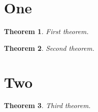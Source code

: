 \documentclass{article}
\newtheorem{theo}{Theorem}
\begin{document}
\section{One}
\begin{theo}
First theorem.
\end{theo}

\begin{theo}
Second theorem.
\end{theo}

\section{Two}
\begin{theo}
Third theorem.
\end{theo}
\end{document}
